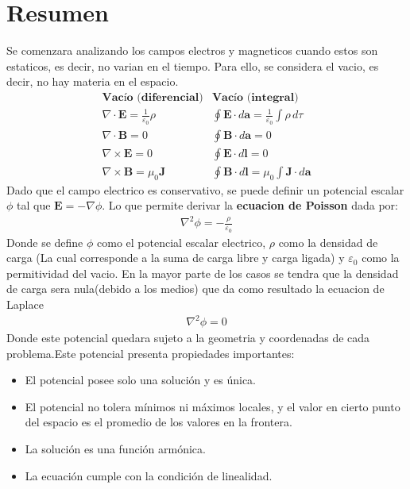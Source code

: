 \documentclass[
  11pt,
  letterpaper,
   addpoints,
   answers
  ]{exam}
\begin{document}
\section{Resumen}
Se comenzara analizando los campos electros y magneticos cuando estos son estaticos, es decir, no varian en el tiempo. Para ello, se considera el vacio, es decir, no hay materia en el espacio. 
\begin{equation}
    \begin{array}{c|c}
    \textbf{Vacío (diferencial)} & \textbf{Vacío (integral)} \\[8pt]
    \nabla \cdot \mathbf{E} = \frac{1}{\varepsilon_0} \rho 
    & \oint \mathbf{E} \cdot d\mathbf{a} = \frac{1}{\varepsilon_0} \int \rho \, d\tau \\[5pt]
    \nabla \cdot \mathbf{B} = 0 
    & \oint \mathbf{B} \cdot d\mathbf{a} = 0 \\[5pt]
    \nabla \times \mathbf{E} = 0 
    & \oint \mathbf{E} \cdot d\mathbf{l} = 0 \\[5pt]
    \nabla \times \mathbf{B} = \mu_0 \mathbf{J} 
    & \oint \mathbf{B} \cdot d\mathbf{l} = \mu_0 \int \mathbf{J} \cdot d\mathbf{a}
    \end{array}
\end{equation}
Dado que el campo electrico es conservativo, se puede definir un potencial escalar $\phi$ tal que $\mathbf{E} = -\nabla \phi$. Lo que permite derivar la \textbf{ecuacion de Poisson} dada por:
\begin{align}
    \nabla^2 \phi = -\frac{\rho}{\varepsilon_0}
\end{align}
Donde se define $\phi$ como el potencial escalar electrico, $\rho$ como la densidad de carga (La cual corresponde a la suma de carga libre y carga ligada) y $\varepsilon_0$ como la permitividad del vacio. En la mayor parte de los casos se tendra que la densidad de carga sera nula(debido a los medios) que da como resultado la ecuacion de Laplace
\begin{align}
    \nabla^2 \phi = 0
\end{align}
Donde este potencial quedara sujeto a la geometria y coordenadas de cada problema.Este potencial presenta propiedades importantes:
\begin{itemize}
    \item El potencial posee solo una solución y es única.
    \item El potencial no tolera mínimos ni máximos locales, y el valor en cierto punto del espacio es el promedio de los valores en la frontera.
    \item La solución es una función armónica.
    \item La ecuación cumple con la condición de linealidad.
\end{itemize}
\end{document}
